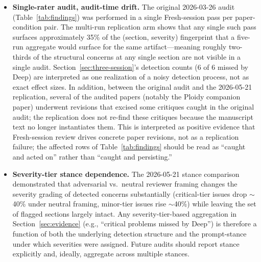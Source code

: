 \documentclass[12pt]{article}
\begin{document}
\begin{itemize}
    \item \textbf{Single-rater audit, audit-time drift.} The original 2026-03-26 audit (Table~\ref{tab:findings}) was performed in a single Fresh-session pass per paper-condition pair. The multi-run replication arm shows that any single such pass surfaces approximately 35\% of the (section, severity) fingerprint that a five-run aggregate would surface for the same artifact---meaning roughly two-thirds of the structural concerns at any single section are not visible in a single audit. Section~\ref{sec:three-session}'s detection counts (6 of 6 missed by Deep) are interpreted as one realization of a noisy detection process, not as exact effect sizes. In addition, between the original audit and the 2026-05-21 replication, several of the audited papers (notably the Ploidy companion paper) underwent revisions that excised some critiques caught in the original audit; the replication does not re-find these critiques because the manuscript text no longer instantiates them. This is interpreted as positive evidence that Fresh-session review drives concrete paper revisions, not as a replication failure; the affected rows of Table~\ref{tab:findings} should be read as ``caught and acted on'' rather than ``caught and persisting.''

    \item \textbf{Severity-tier stance dependence.} The 2026-05-21 stance comparison demonstrated that adversarial vs.\ neutral reviewer framing changes the severity grading of detected concerns substantially (critical-tier issues drop $\sim$40\% under neutral framing, minor-tier issues rise $\sim$40\%) while leaving the set of flagged sections largely intact. Any severity-tier-based aggregation in Section~\ref{sec:evidence} (e.g., ``critical problems missed by Deep'') is therefore a function of both the underlying detection structure and the prompt-stance under which severities were assigned. Future audits should report stance explicitly and, ideally, aggregate across multiple stances.
\end{itemize}
\end{document}

